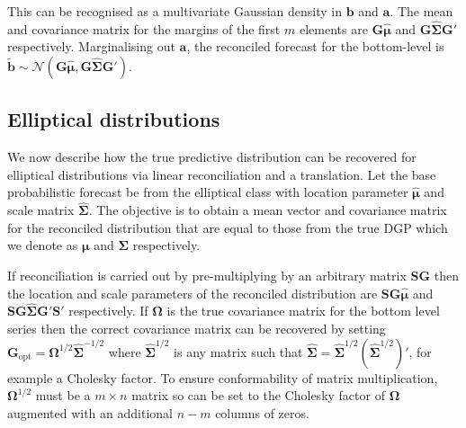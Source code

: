 \documentclass[12pt]{article}
\def\PQ{\begin{pmatrix}\bm{G}\\[-0.2cm]\bm{G}'_{\perp}\end{pmatrix}}
\theoremstyle{definition}
\begin{document}

This can be recognised as a multivariate Gaussian density in $\bm{b}$ and $\bm{a}$.  The mean and covariance matrix for the margins of the first $m$ elements are $\bm{G}\hat{\bm{\mu}}$ and $\bm{G}\hat{\bm{\Sigma}}\bm{G}'$ respectively.  Marginalising out $\bm {a}$, the reconciled forecast for the bottom-level is $\tilde{\bm{b}} \sim \mathcal{N}(\bm{G}\hat{\bm{\mu}}, \bm{G}\hat{\bm{\Sigma}}\bm{G}')$. 



\subsection{Elliptical distributions}

We now describe how the true predictive distribution can be recovered for elliptical distributions via linear reconciliation and a translation.  Let the base probabilistic forecast be from the elliptical class with location parameter $\hat{\bm{\mu}}$ and scale matrix $\hat{\bm{\Sigma}}$. The objective is to obtain a mean vector and covariance matrix for the reconciled distribution that are equal to those from the true DGP which we denote as $\bm{\mu}$ and $\bm{\Sigma}$ respectively.  

If reconciliation is carried out by pre-multiplying by an arbitrary matrix $\bm{S}\bm{G}$ then the location and scale parameters of the reconciled distribution are $\bm{S}\bm{G}\hat{\bm{\mu}}$ and $\bm{S}\bm{G}\hat{\bm{\Sigma}}{\bm{G}}'\bm{S}'$ respectively.  If ${\bm\Omega}$ is the true covariance matrix for the bottom level series then the correct covariance matrix can be recovered by setting ${\bm G}_{\textrm{opt}}={\bm{\Omega}}^{1/2}\hat{\bm \Sigma}^{-1/2}$ where $\hat{\bm \Sigma}^{1/2}$ is any matrix such that $\hat{\bm \Sigma}=\hat{\bm \Sigma}^{1/2}(\hat{\bm \Sigma}^{1/2})'$, for example a Cholesky factor. To ensure conformability of matrix multiplication, ${\bm{\Omega}}^{1/2}$ must be a $m\times n$ matrix so can be set to the Cholesky factor of ${\bm{\Omega}}$ augmented with an additional $n-m$ columns of zeros.
\end{document}
